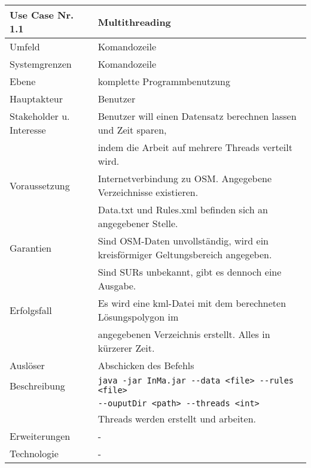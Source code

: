 \begin{tabular}{| l | l |}
 \hline
 \textbf{Use Case Nr. 1.1} & Multithreading\\
 \hline
 Umfeld & Komandozeile\\
 \hline
 Systemgrenzen & Komandozeile\\
 \hline
 Ebene & komplette Programmbenutzung\\
 \hline
 Hauptakteur & Benutzer\\
 \hline
 Stakeholder u. Interesse & Benutzer will einen Datensatz berechnen lassen und Zeit sparen,\\
			  & indem die Arbeit auf mehrere Threads verteilt wird.\\
 \hline
 Voraussetzung & Internetverbindung zu OSM. Angegebene Verzeichnisse existieren.\\
	      & Data.txt und Rules.xml befinden sich an angegebener Stelle. \\
 \hline
 Garantien & Sind OSM-Daten unvollständig, wird ein kreisförmiger Geltungsbereich angegeben.\\
	  & Sind SURs unbekannt, gibt es dennoch eine Ausgabe.\\
 \hline
 Erfolgsfall & Es wird eine kml-Datei mit dem berechneten Lösungspolygon im\\
	    & angegebenen Verzeichnis erstellt. Alles in kürzerer Zeit.\\
 \hline
 Auslöser & Abschicken des Befehls\\
 \hline
 Beschreibung & \verb|java -jar InMa.jar --data <file> --rules <file>|\\
	      & \hspace{24pt}\verb|--ouputDir <path> --threads <int>|\\
	      & Threads werden erstellt und arbeiten.\\
 \hline
 Erweiterungen & -\\
 \hline
 Technologie & -\\
 \hline
\end{tabular}


